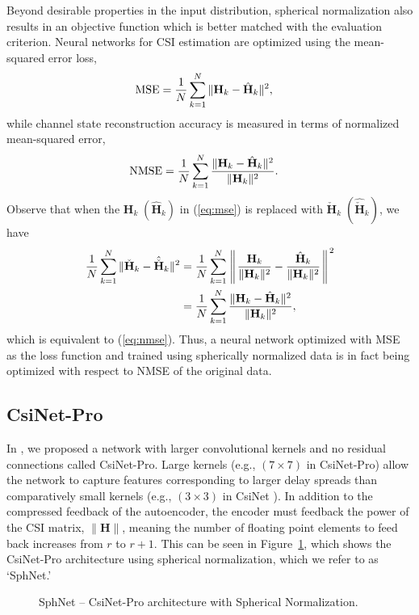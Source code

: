 Beyond desirable properties in the input distribution, spherical normalization also results in an objective function which is better matched with the evaluation criterion. Neural networks for CSI estimation are optimized using the mean-squared error loss,
\begin{align} 
	\text{MSE}&=\frac 1N \sum_{k=1}^N\Arrowvert\mathbf H_k - \hat{\mathbf H}_k\Arrowvert^2, \label{eq:mse}
\end{align}
while channel state reconstruction accuracy is measured in terms of normalized mean-squared error,
\begin{align} 
	\text{NMSE}&=\frac 1N \sum_{k=1}^N\frac{\Arrowvert\mathbf H_k - \hat{\mathbf H}_k\Arrowvert^2}{\Arrowvert\mathbf H_k\Arrowvert^2}. \label{eq:nmse}
\end{align}
Observe that when the $\mathbf H_k \; (\hat{\mathbf H}_k)$ in (\ref{eq:mse}) is replaced with $\check{\mathbf H}_k \; (\hat{\check{\mathbf H}}_k)$, we have
\begin{align*} 
	\frac 1N \sum_{k=1}^N\Arrowvert\check{\mathbf H}_k - \hat{\check{\mathbf H}}_k\Arrowvert^2&= \frac 1N \sum_{k=1}^N\left\Arrowvert \frac{\mathbf H_k}{\Arrowvert\mathbf H_k\Arrowvert^2} - \frac{\hat{\mathbf H}_k}{\Arrowvert\mathbf H_k\Arrowvert^2}\right\Arrowvert^2 \\
	&= \frac 1N \sum_{k=1}^N\frac{\Arrowvert\mathbf H_k - \hat{\mathbf H}_k\Arrowvert^2}{\Arrowvert\mathbf H_k\Arrowvert^2},
\end{align*}
which is equivalent to (\ref{eq:nmse}). Thus, a neural network optimized with MSE as the loss function and trained using spherically normalized data is in fact being optimized with respect to NMSE of the original data.

\subsection{CsiNet-Pro}
\label{sect:csinet_pro}

In \cite{ref:liu2020sphnet}, we proposed a network with larger convolutional kernels and no residual connections called CsiNet-Pro. Large kernels (e.g., $(7\times 7)$ in CsiNet-Pro) allow the network to capture features corresponding to larger delay spreads than comparatively small kernels (e.g., $(3\times 3)$ in CsiNet \cite{ref:csinet}). In addition to the compressed feedback of the autoencoder, the encoder must feedback the power of the CSI matrix, $\|\mathbf{H}\|$, meaning the number of floating point elements to feed back increases from $r$ to $r+1$. This can be seen in Figure~\ref{fig:sphnet-arch}, which shows the CsiNet-Pro architecture using spherical normalization, which we refer to as `SphNet.'  
\begin{figure}[htb]
  \centering
  {
    \fontsize{6pt}{6pt}
    \def\svgwidth{1.0\columnwidth}
    
  }
  \caption{SphNet -- CsiNet-Pro architecture with Spherical Normalization.}
  \label{fig:sphnet-arch}
\end{figure}

